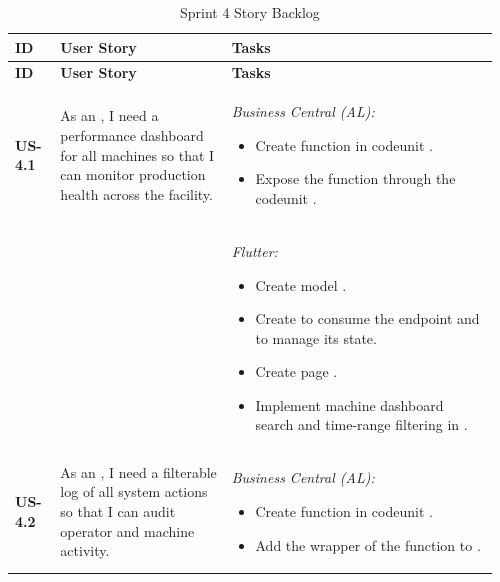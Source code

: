 \begin{longtable}{@{} P{0.09\linewidth} P{0.34\linewidth} P{0.53\linewidth} @{}}
  \caption{Sprint 4 Story Backlog}
  \label{tab:s4-sprint-backlog} \\
  \toprule
  \textbf{ID} & \textbf{User Story} & \textbf{Tasks} \\
  \midrule
  \endfirsthead
  \toprule
  \textbf{ID} & \textbf{User Story} & \textbf{Tasks} \\
  \midrule
  \endhead
  
  \bottomrule
  \endlastfoot

  \textbf{US-4.1}
  & As an , I need a performance dashboard for all
  machines so that I can monitor production health across the facility.
  & \noindent\textit{Business Central (AL):}
  \begin{itemize}[nosep, leftmargin=*]
    \item Create function  in codeunit .
    \item Expose the function through the codeunit .
  \end{itemize}\\ & &
  \noindent\textit{Flutter:}
  \begin{itemize}[nosep, leftmargin=*]
    \item Create model .
    \item Create  to consume the  endpoint and  to manage its state.
    \item Create page .
    \item Implement machine dashboard search and time-range filtering in .
  \end{itemize} \\  
  \midrule 
  \textbf{US-4.2}
  & As an , I need a filterable log of all
  system actions so that I can audit operator and machine activity.
  & \noindent\textit{Business Central (AL):}
  \begin{itemize}[nosep, leftmargin=*]
    \item Create function  in codeunit .
    \item Add the wrapper of the function to .

\end{itemize}
\end{longtable}
